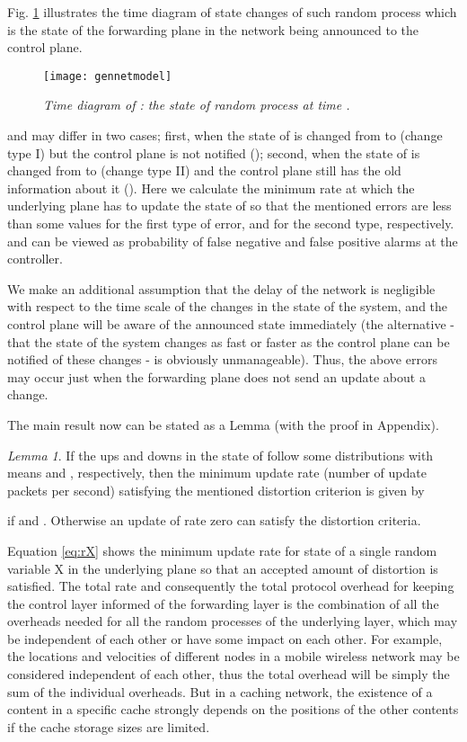 \documentclass[conference]{IEEEtran}
\theoremstyle{plain}
\theoremstyle{remark}
\newtheorem{lemma}{Lemma}
\begin{document}
Fig. \ref{fig:statetime} illustrates the time diagram of state changes of such random process which is the state of the forwarding plane in the network being announced to the control plane. 

\begin{figure}[http]
    \center
      \texttt{[image: gennetmodel]}\\
      \caption{\textit{Time diagram of : the state of random process  at time .}}
    \label{fig:statetime}
\end{figure}


 and  may differ in two cases; first, when the state of  is changed from  to  (change type I) but the control plane is not notified (); second, when the state of  is changed from  to  (change type II) and the control plane still has the old information about it (). Here we calculate the minimum rate at which the underlying plane has to update the state of  so that the mentioned errors are less than some values  for the first type of error, and  for the second type, respectively.  and  can be viewed as probability of false negative and false positive alarms at the controller.

We make an additional assumption that the delay of the network is negligible with respect to the time scale of the changes in the state of the system, and the control plane will be aware of the announced state immediately (the alternative - that the state of the system changes as fast or faster as the control plane can be notified of these changes - is obviously unmanageable). Thus, the above errors may occur just when the forwarding plane does not send an update about a change.

The main result now can be stated as a Lemma (with the proof in Appendix).

\begin{lemma}\label{lem:01}
	If the ups and downs in the state of  follow some distributions with means  and , respectively, then the minimum update rate  (number of update packets per second) satisfying the mentioned distortion criterion is given by

if  and . Otherwise an update of rate zero can satisfy the distortion criteria.
\end{lemma}

Equation \ref{eq:rX} shows the minimum update rate for state of a single random variable X in the underlying plane so that an accepted amount of distortion is satisfied. The total rate and consequently the total protocol overhead for keeping the control layer informed of the forwarding layer is the combination of all the overheads needed for all the random processes of the underlying layer, which may be independent of each other or have some impact on each other.
For example, the locations and velocities of different nodes in a mobile wireless network may be considered independent of each other, thus the total overhead will be simply the sum of the individual overheads. But in a caching network, the existence of a content in a specific cache strongly depends on the positions of the other contents if the cache storage sizes are limited.
\end{document}
